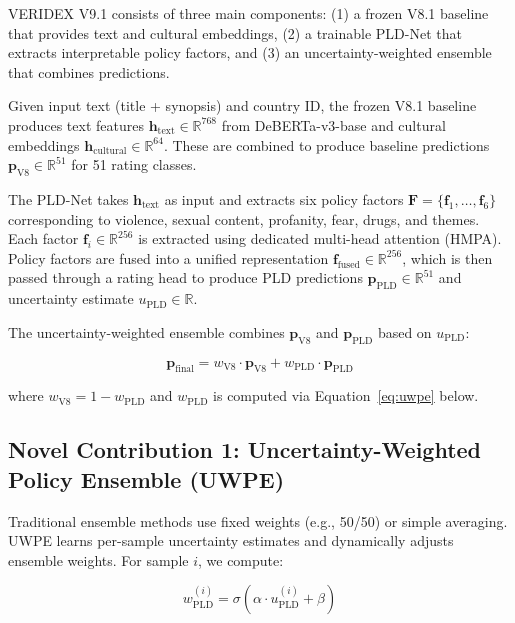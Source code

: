 \documentclass[11pt]{article}
\begin{document}
VERIDEX V9.1 consists of three main components: (1) a frozen V8.1 baseline that provides text and cultural embeddings, (2) a trainable PLD-Net that extracts interpretable policy factors, and (3) an uncertainty-weighted ensemble that combines predictions.

Given input text (title + synopsis) and country ID, the frozen V8.1 baseline produces text features $\mathbf{h}_{\text{text}} \in \mathbb{R}^{768}$ from DeBERTa-v3-base and cultural embeddings $\mathbf{h}_{\text{cultural}} \in \mathbb{R}^{64}$. These are combined to produce baseline predictions $\mathbf{p}_{\text{V8}} \in \mathbb{R}^{51}$ for 51 rating classes.

The PLD-Net takes $\mathbf{h}_{\text{text}}$ as input and extracts six policy factors $\mathbf{F} = \{\mathbf{f}_1, \ldots, \mathbf{f}_6\}$ corresponding to violence, sexual content, profanity, fear, drugs, and themes. Each factor $\mathbf{f}_i \in \mathbb{R}^{256}$ is extracted using dedicated multi-head attention (HMPA). Policy factors are fused into a unified representation $\mathbf{f}_{\text{fused}} \in \mathbb{R}^{256}$, which is then passed through a rating head to produce PLD predictions $\mathbf{p}_{\text{PLD}} \in \mathbb{R}^{51}$ and uncertainty estimate $u_{\text{PLD}} \in \mathbb{R}$.

The uncertainty-weighted ensemble combines $\mathbf{p}_{\text{V8}}$ and $\mathbf{p}_{\text{PLD}}$ based on $u_{\text{PLD}}$:

\begin{equation}
\mathbf{p}_{\text{final}} = w_{\text{V8}} \cdot \mathbf{p}_{\text{V8}} + w_{\text{PLD}} \cdot \mathbf{p}_{\text{PLD}}
\end{equation}

where $w_{\text{V8}} = 1 - w_{\text{PLD}}$ and $w_{\text{PLD}}$ is computed via Equation~\ref{eq:uwpe} below.

\subsection{Novel Contribution 1: Uncertainty-Weighted Policy Ensemble (UWPE)}

Traditional ensemble methods use fixed weights (e.g., 50/50) or simple averaging. UWPE learns per-sample uncertainty estimates and dynamically adjusts ensemble weights. For sample $i$, we compute:

\begin{equation}
\label{eq:uwpe}
w_{\text{PLD}}^{(i)} = \sigma(\alpha \cdot u_{\text{PLD}}^{(i)} + \beta)
\end{equation}
\end{document}
